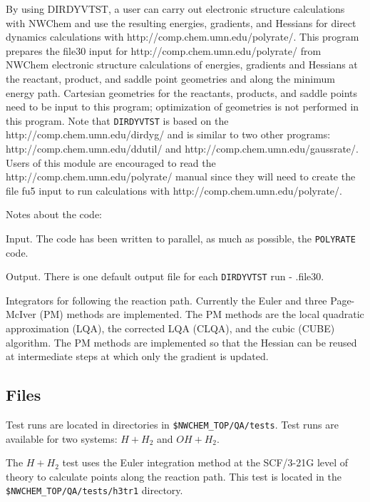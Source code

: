 By using DIRDYVTST, a user can carry out electronic structure calculations
with NWChem and use the resulting energies, gradients, and Hessians for
direct dynamics calculations with 
{http://comp.chem.umn.edu/polyrate/}.
This program prepares the file30 input for 
{http://comp.chem.umn.edu/polyrate/} from NWChem
electronic structure calculations of energies, gradients and Hessians at the 
reactant, product, and saddle point geometries and along the minimum
energy path.  Cartesian geometries for the reactants, products, and 
saddle points need to be input to this program; optimization of 
geometries is not performed in this program.  Note that \verb+DIRDYVTST+ is
based on the  
{http://comp.chem.umn.edu/dirdyg/}
and is similar to two other programs: 
{http://comp.chem.umn.edu/ddutil/} and 
{http://comp.chem.umn.edu/gaussrate/}.  Users of this module are
encouraged to read the 
{http://comp.chem.umn.edu/polyrate/} manual since they will need to
create the file fu5 input to run calculations with 
{http://comp.chem.umn.edu/polyrate/}.

Notes about the code:

Input.  The code has been written to parallel, as much as possible,
the \verb+POLYRATE+ code.  

Output.  There is one default output file for each \verb+DIRDYVTST+ run - .file30.

Integrators for following the reaction path.  
Currently the Euler and three Page-McIver (PM) methods 
are implemented.  The PM methods are the local quadratic approximation 
(LQA), the corrected LQA (CLQA), and the cubic (CUBE) algorithm.
The PM methods are implemented so that the Hessian can be reused at
intermediate steps at which only the gradient is updated.  


\subsection{Files}

Test runs are located in directories in \verb+$NWCHEM_TOP/QA/tests+.  Test 
runs are available for two systems: $H + H_2$ and $OH + H_2$.

The $H + H_2$ test uses the Euler integration method at the SCF/3-21G level
of theory to calculate points along the reaction path.
This test is located in the \verb+$NWCHEM_TOP/QA/tests/h3tr1+ directory.

